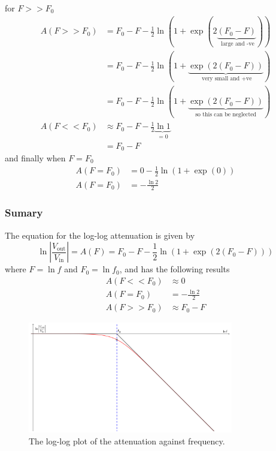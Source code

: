 for $F>>F_0$
\begin{align}
  A(F>>F_0) &= F_0 - F  -\frac{1}{2} \ln\left(1+\exp(2\underbrace{(F_0 - F)}_{\text{ large and -ve}})\right) \nonumber \\
  &= F_0 - F  -\frac{1}{2} \ln\left(1+\underbrace{\exp(2(F_0 - F))}_{\text{ very small and +ve}}\right) \nonumber \\
  &= F_0 - F  -\frac{1}{2} \ln\left(1+\underbrace{\exp(2(F_0 - F))}_{\text{so this can be neglected}}\right) \nonumber \\
  A(F<<F_0) &\approx F_0 - F  -\frac{1}{2} \underbrace{\ln 1}_{=0} \nonumber \\
  &= F_0 - F \label{eq:RC_log_log_large_F}
\end{align}
and finally when $F=F_0$
\begin{align}
  A(F=F_0) &=  0 -\frac{1}{2} \ln\left(1+\exp(0)\right) \nonumber \\
  A(F=F_0) &= -\frac{\ln 2}{2} \label{eq:RC_log_log_equal}
\end{align}

\begin{framed}
\subsubsection*{Sumary}
The equation for the log-log attenuation is given by
\begin{equation*}
\ln \left|\frac{V_{\text{out}}}{V_{\text{in}}} \right| = A(F) = F_0 - F  -\frac{1}{2} \ln\left(1+\exp(2(F_0 - F))\right)
\end{equation*}
where $F=\ln f$ and $F_0 = \ln f_0$, and has the following results
\begin{align*}
   A(F<<F_0) &\approx 0 \\
   A(F=F_0) &= -\frac{\ln 2}{2} \\
   A(F>>F_0) &\approx F_0 - F
\end{align*}
\end{framed}
\begin{figure}[h]
  \centering
\includegraphics[width=0.8\textwidth]{img/RC_log_log_plot}
\caption{The log-log plot of the attenuation against frequency.} \label{fig:RC_log_log}
\end{figure}
